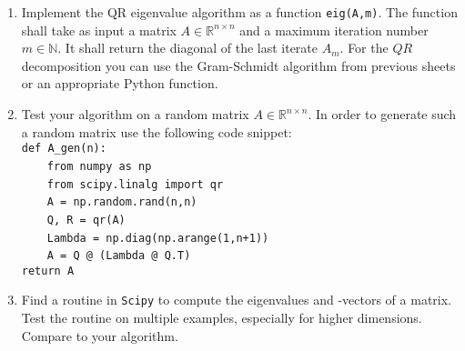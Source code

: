 \begin{enumerate}
	\item Implement the QR eigenvalue algorithm as a function \verb|eig(A,m)|. The function shall take as input a matrix $A\in \mathbb{R}^{n\times n}$ and a maximum iteration number $m\in\mathbb{N}$. It shall return the diagonal of the last iterate $A_m$. For the $QR$ decomposition you can use the Gram-Schmidt algorithm from previous sheets or an appropriate Python function.
	\item Test your algorithm on a random matrix $A\in \mathbb{R}^{n\times n}$. In order to generate such a random matrix use the following code snippet:\\[2pt]
		\verb|def A_gen(n): |\\
        \textcolor{white}{~~~~}\verb|from numpy as np|\\
        \textcolor{white}{~~~~}\verb|from scipy.linalg import qr|\\
        \textcolor{white}{~~~~}\verb|A = np.random.rand(n,n)|\\
		\textcolor{white}{~~~~}\verb|Q, R = qr(A)|\\
		\textcolor{white}{~~~~}\verb|Lambda = np.diag(np.arange(1,n+1))|\\
		\textcolor{white}{~~~~}\verb|A = Q @ (Lambda @ Q.T)|\\
		\verb|return A|
	\item Find a routine in \texttt{Scipy} to compute the eigenvalues and -vectors of a matrix. Test the routine on multiple examples, especially for higher dimensions. Compare to your algorithm.
	
\end{enumerate}






